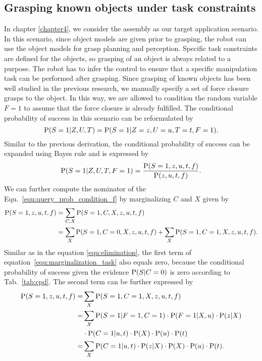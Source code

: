 \subsection{Grasping known objects under task constraints}
In chapter \ref{chapter4}, we consider the assembly as our target application scenario. In this scenario, since object models are given prior to grasping, the robot can use the object models for grasp planning and perception. Specific task constraints are defined for the objects, so grasping of an object is always related to a purpose. The robot has to infer the control to ensure that a specific manipulation task can be performed after grasping. Since grasping of known objects has been well studied in the previous research, we manually specify a set of force closure grasps to the object. In this way, we are allowed to condition the random variable $F=1$ to assume that the force closure is already fulfilled. The conditional probability of success in this scenario can be reformulated by 
\begin{equation}
\operatorname*{\text{P}} (S = 1| Z, U ,T) = \operatorname*{\text{P}}(S = 1|Z=z,U=u,T=t, F=1). 
\end{equation}
Similar to the previous derivation, the conditional probability of success can be expanded using Bayes rule and is expressed by 
\begin{equation}
\operatorname*{\text{P}} (S = 1| Z, U ,T, F = 1) =  \frac{\operatorname*{\text{P}}(S = 1, z, u, t, f)}{\operatorname*{\text{P}}(z,u,t,f)}.  
\label{equ:query_prob_condition_f}
\end{equation}
We can further compute the nominator of the Equ.~\ref{equ:query_prob_condition_f} by marginalizing $C$ and $X$ given by 
\begin{equation}
\begin{split}
\operatorname*{\text{P}}(S = 1, z, u, t, f) &= \sum_{C,X} \operatorname*{\text{P}} (S=1,C,X,z,u,t,f)  \\
                       &= \sum_{X}  \operatorname*{\text{P}} (S=1, C = 0, X, z,u,t,f) + \sum_{X} \operatorname*{\text{P}}(S=1,C=1,X,z,u,t,f).
\end{split}
\label{equ:marginalization_task}
\end{equation}
Similar as in the equation \ref{equ:elimination}, the first term of equation~\ref{equ:marginalization_task} also equals zero, because the conditional probability of success given the evidence $\operatorname*{\text{P}}(S|C=0)$ is zero according to Tab.~\ref{tab:cpd}. The second term can be further expressed by   
\begin{equation}
\begin{split}
 \operatorname*{\text{P}}(S = 1, z, u, t, f)  = & \sum_{X} \operatorname*{\text{P}}(S=1,C=1,X,z,u,t,f)  \\
 					    =& \sum_{X} \operatorname*{\text{P}} (S=1|F=1,C=1) \cdot \operatorname*{\text{P}}(F = 1|X,u)\cdot\operatorname*{\text{P}}(z|X) \\
 					     &\cdot \operatorname*{\text{P}}(C=1|u,t) \cdot \operatorname*{\text{P}}(X) \cdot \operatorname*{\text{P}}(u) \cdot \operatorname*{\text{P}}(t) \\
 					    =&\sum_{X} \operatorname*{\text{P}}(C=1|u,t) \cdot\operatorname*{\text{P}}(z|X) \cdot \operatorname*{\text{P}}(X) \cdot \operatorname*{\text{P}}(u) \cdot \operatorname*{\text{P}}(t). \\ 
\end{split}
\end{equation}
